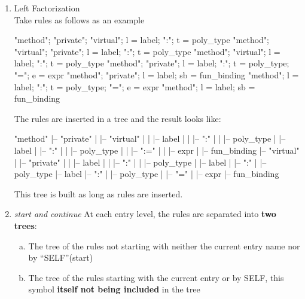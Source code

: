   \begin{enumerate}
  \item Left Factorization \\
    Take rules as follows as an example
    
    \begin{ocamlcode}
      "method"; "private"; "virtual"; l = label; ":"; t = poly_type
      "method"; "virtual"; "private"; l = label; ":"; t = poly_type
      "method"; "virtual"; l = label; ":"; t = poly_type
      "method"; "private"; l = label; ":"; t = poly_type; "="; e = expr
      "method"; "private"; l = label; sb = fun_binding
      "method"; l = label; ":"; t = poly_type; "="; e = expr
      "method"; l = label; sb = fun_binding
    \end{ocamlcode}

    The rules are inserted in a tree and the result looks like:
    
\begin{ocamlcode}
  "method"
     |-- "private"
     |       |-- "virtual"
     |       |       |-- label
     |       |             |-- ":"
     |       |                  |-- poly_type
     |       |-- label
     |             |-- ":"
     |             |    |-- poly_type
     |             |            |-- ":="
     |             |                 |-- expr
     |             |-- fun_binding
     |-- "virtual"
     |       |-- "private"
     |       |       |-- label
     |       |             |-- ":"
     |       |                  |-- poly_type
     |       |-- label
     |             |-- ":"
     |                  |-- poly_type
     |-- label
           |-- ":"
           |    |-- poly_type
           |            |-- "="
           |                 |-- expr
           |-- fun_binding
      
    \end{ocamlcode}

This tree is built as long as rules are inserted.
\item \textit{start and continue}
  At each entry level, the rules are separated into \textbf{two
    trees}:
  \begin{enumerate}[(a)]
  \item The tree of the rules not starting with neither the current entry name
    nor by ``SELF''(start)
  \item The tree of the rules starting with the current entry or by
    SELF, this symbol \textbf{itself not being included} in the tree
  \end{enumerate}


\end{enumerate}
